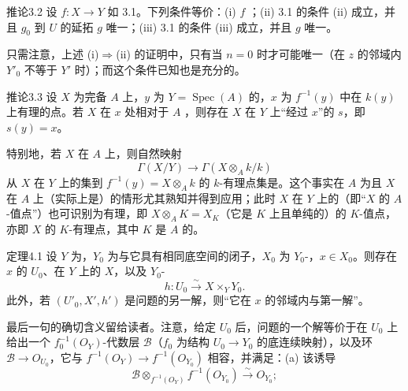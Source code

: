 \begin{SGAresult}{推论}{3.2}
设 $f:X\to Y$ 如 3.1。下列条件等价：(i) $f$ ；(ii) 3.1 的条件 (ii) 成立，并且 $g_0$ 到 $U$ 的延拓 $g$ 唯一；(iii) 3.1 的条件 (iii) 成立，并且 $g$ 唯一。
\end{SGAresult}
只需注意，上述 (i)$\Rightarrow$(ii) 的证明中，只有当 $n=0$ 时才可能唯一（在 $z$ 的邻域内 $Y'_0$ 不等于 $Y'$ 时）；而这个条件已知也是充分的。
\begin{SGAresult}{推论}{3.3}
设 $X$ 为完备 $A$ 上，$y$ 为 $Y=\operatorname{Spec}(A)$ 的，$x$ 为 $f^{-1}(y)$ 中在 $k(y)$ 上有理的点。若 $X$ 在 $x$ 处相对于 $A$ ，则存在 $X$ 在 $Y$ 上“经过 $x$”的 $s$，即 $s(y)=x$。
\end{SGAresult}
特别地，若 $X$ 在 $A$ 上，则自然映射
\[\Gamma(X/Y)\longrightarrow\Gamma(X\otimes_A k/k)\]
从 $X$ 在 $Y$ 上的集到 $f^{-1}(y)=X\otimes_A k$ 的 $k$-有理点集是。这个事实在 $A$ 为且 $X$ 在 $A$ 上（实际上是）的情形尤其熟知并得到应用；此时 $X$ 在 $Y$ 上的（即“$X$ 的 $A$-值点”）也可识别为有理，即 $X\otimes_A K=X_K$（它是 $K$ 上且单纯的）的 $K$-值点，亦即 $X$ 的 $K$-有理点，其中 $K$ 是 $A$ 的。
\begin{SGAresult}{定理}{4.1}
设 $Y$ 为，$Y_0$ 为与它具有相同底空间的闭子，$X_0$ 为 $Y_0$-，$x\in X_0$。则存在 $x$ 的 $U_0$、在 $Y$ 上的 $X$，以及 $Y_0$-
\[h:U_0\xrightarrow{\sim}X\times_Y Y_0.\]
此外，若 $(U'_0,X',h')$ 是问题的另一解，则“它在 $x$ 的邻域内与第一解”。
\end{SGAresult}
最后一句的确切含义留给读者。注意，给定 $U_0$ 后，问题的一个解等价于在 $U_0$ 上给出一个 $f_0^{-1}(O_Y)$-代数层 $\mathcal B$（$f_0$ 为结构 $U_0\to Y_0$ 的底连续映射），以及环 $\mathcal B\to O_{U_0}$，它与 $f^{-1}(O_Y)\to f^{-1}(O_{Y_0})$ 相容，并满足：(a) 该诱导
\[\mathcal B\otimes_{f^{-1}(O_Y)}f^{-1}(O_{Y_0})\xrightarrow{\sim}O_{Y_0};\]
